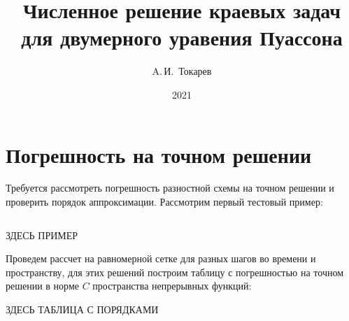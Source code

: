 \documentclass[12pt, a4paper]{article}
\title{Численное решение краевых задач для двумерного уравения Пуассона}
\author{A.\,И.~Токарев}
\date{2021}
\newcommand{\Picture}[4]
{
\begin{figure}[H]
\noindent 
\centering\texttt{[image: pic/\#1]}
\caption{#3}
\label{#4}
\end{figure}
}
\begin{document}
\maketitle
\tableofcontents 
\newpage

\section{Погрешность на точном решении}

Требуется рассмотреть погрешность разностной схемы на точном решении и проверить порядок аппроксимации. Рассмотрим первый тестовый пример:

\[
\]

\centerline{ЗДЕСЬ ПРИМЕР}

Проведем рассчет на равномерной сетке для разных шагов во времени и пространству, для этих решений построим таблицу с погрешностью на точном решении в норме $C$ пространства непрерывных функций:

\centerline{ЗДЕСЬ ТАБЛИЦА С ПОРЯДКАМИ}


\newpage
\end{document}
